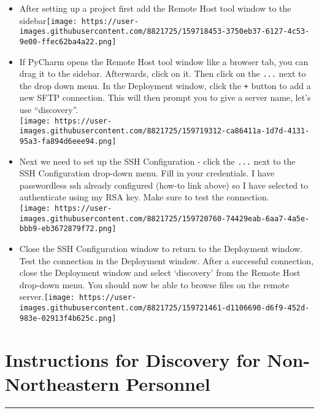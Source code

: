 \documentclass[
  letterpaper,
  DIV=11,
  numbers=noendperiod]{scrreprt}
\begin{document}

\begin{itemize}
\item
  After setting up a project first add the Remote Host tool window to
  the
  sidebar\texttt{[image: https://user-images.githubusercontent.com/8821725/159718453-3750eb37-6127-4c53-9e00-ffec62ba4a22.png]}
\item
  If PyCharm opens the Remote Host tool window like a browser tab, you
  can drag it to the sidebar. Afterwards, click on it. Then click on the
  \texttt{...} next to the drop down menu. In the Deployment window,
  click the \texttt{+} button to add a new SFTP connection. This will
  then prompt you to give a server name, let's use ``discovery''.\\
  \texttt{[image: https://user-images.githubusercontent.com/8821725/159719312-ca86411a-1d7d-4131-95a3-fa894d6eee94.png]}
\item
  Next we need to set up the SSH Configuration - click the \texttt{...}
  next to the SSH Configuration drop-down menu. Fill in your
  credentials. I have passwordless ssh already configured (how-to link
  above) so I have selected to authenticate using my RSA key. Make sure
  to test the connection.\\
  \texttt{[image: https://user-images.githubusercontent.com/8821725/159720760-74429eab-6aa7-4a5e-bbb9-eb3672879f72.png]}
\item
  Close the SSH Configuration window to return to the Deployment window.
  Test the connection in the Deployment window. After a successful
  connection, close the Deployment window and select `discovery' from
  the Remote Host drop-down menu. You should now be able to browse files
  on the remote
  server.\texttt{[image: https://user-images.githubusercontent.com/8821725/159721461-d1106690-d6f9-452d-983e-02913f4b625c.png]}
\end{itemize}

\hfill\break

\hypertarget{instructions-for-discovery-for-non-northeastern-personnel}{%
\chapter{Instructions for Discovery for Non-Northeastern
Personnel}\label{instructions-for-discovery-for-non-northeastern-personnel}}

\begin{center}\rule{0.5\linewidth}{0.5pt}\end{center}
\end{document}
